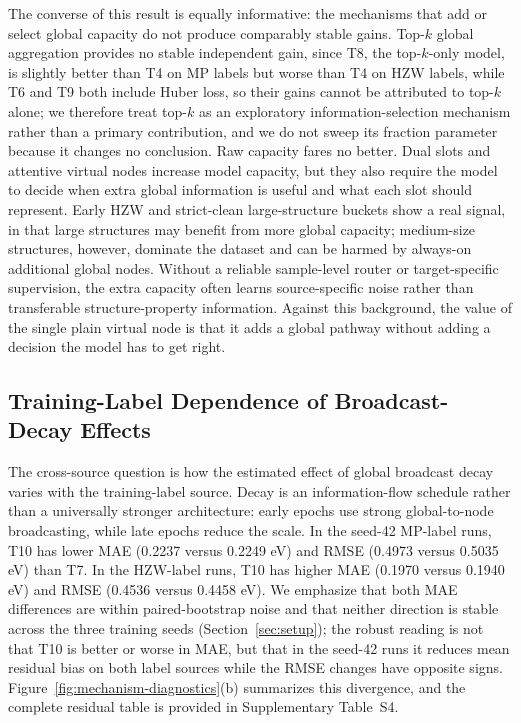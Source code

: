 \documentclass[a4paper,11pt]{article}
\begin{document}
The converse of this result is equally informative: the mechanisms that add or select global capacity do not produce comparably stable gains. Top-\(k\) global aggregation provides no stable independent gain, since T8, the top-\(k\)-only model, is slightly better than T4 on MP labels but worse than T4 on HZW labels, while T6 and T9 both include Huber loss, so their gains cannot be attributed to top-\(k\) alone; we therefore treat top-\(k\) as an exploratory information-selection mechanism rather than a primary contribution, and we do not sweep its fraction parameter because it changes no conclusion. Raw capacity fares no better. Dual slots and attentive virtual nodes increase model capacity, but they also require the model to decide when extra global information is useful and what each slot should represent. Early HZW and strict-clean large-structure buckets show a real signal, in that large structures may benefit from more global capacity; medium-size structures, however, dominate the dataset and can be harmed by always-on additional global nodes. Without a reliable sample-level router or target-specific supervision, the extra capacity often learns source-specific noise rather than transferable structure-property information. Against this background, the value of the single plain virtual node is that it adds a global pathway without adding a decision the model has to get right.

\subsection{Training-Label Dependence of Broadcast-Decay Effects}
\label{sec:decay-discussion}

The cross-source question is how the estimated effect of global broadcast decay varies with the training-label source. Decay is an information-flow schedule rather than a universally stronger architecture: early epochs use strong global-to-node broadcasting, while late epochs reduce the scale. In the seed-42 MP-label runs, T10 has lower MAE (0.2237 versus 0.2249 eV) and RMSE (0.4973 versus 0.5035 eV) than T7. In the HZW-label runs, T10 has higher MAE (0.1970 versus 0.1940 eV) and RMSE (0.4536 versus 0.4458 eV). We emphasize that both MAE differences are within paired-bootstrap noise and that neither direction is stable across the three training seeds (Section~\ref{sec:setup}); the robust reading is not that T10 is better or worse in MAE, but that in the seed-42 runs it reduces mean residual bias on both label sources while the RMSE changes have opposite signs. Figure~\ref{fig:mechanism-diagnostics}(b) summarizes this divergence, and the complete residual table is provided in Supplementary Table~S4.
\end{document}
